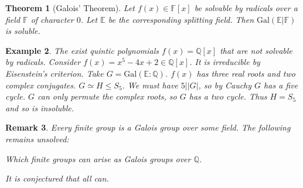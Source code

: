 \documentclass[a4paper,10pt]{article}
\newcommand{\QQ}{\mathbb{Q}}
\newcommand{\EE}{\mathbb{E}}
\newcommand{\FF}{\mathbb{F}}
\newtheorem{thm}{Theorem}
\newtheorem{eg}[thm]{Example}
\newtheorem{rem}[thm]{Remark}
\begin{document}
\begin{thm}[Galois' Theorem]
Let $f(x) \in \FF[x]$ be solvable by radicals over a field $\FF$ of character $0$. Let $\EE$ be the corresponding splitting field. Then $\text{Gal}(\EE | \FF)$ is soluble.
\end{thm}


\begin{eg}
The exist quintic polynomials $f(x) = \QQ[x]$ that are not solvable by radicals. Consider $f(x) = x^5 - 4x + 2 \in \QQ[x]$. It is irreducible by Eisenstein's criterion. Take $G = \text{Gal}( \EE : \QQ)$. $f(x)$ has three real roots and two complex conjugates. $G \simeq H \leq S_5$. We must have $5 | |G|$, so by Cauchy $G$ has a five cycle. $G$ can only permute the complex roots, so $G$ has a two cycle. Thus $H = S_5$ and so is insoluble. 
\end{eg}


\begin{rem}
Every finite group is a Galois group over some field. The following remains unsolved:
\begin{center}
Which finite groups can arise as Galois groups over $\QQ$.
\end{center}
It is conjectured that all can. 
\end{rem}
































 
\end{document}
